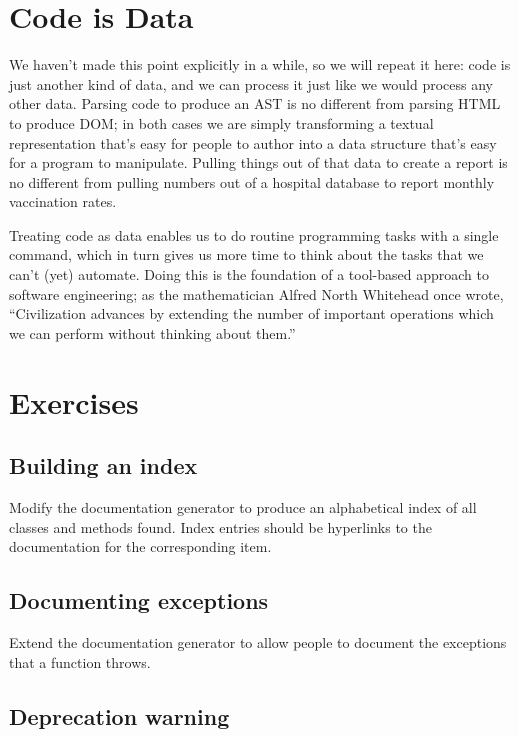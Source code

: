 \documentclass[krantzl]{krantz}
\begin{document}
\section{Code is Data}\label{doc-generator-note}


We haven’t made this point explicitly in a while,
so we will repeat it here:
code is just another kind of data,
and we can process it just like we would process any other data.
Parsing code to produce an AST is no different from parsing HTML to produce DOM;
in both cases we are simply transforming a textual representation that’s easy for people to author
into a data structure that’s easy for a program to manipulate.
Pulling things out of that data to create a report
is no different from pulling numbers out of a hospital database to report monthly vaccination rates.


Treating code as data enables us to do routine programming tasks with a single command,
which in turn gives us more time to think about the tasks that we can’t (yet) automate.
Doing this is the foundation of a tool-based approach to software engineering;
as the mathematician Alfred North Whitehead once wrote,
“Civilization advances by extending the number of important operations which we can perform without thinking about them.”

\section{Exercises}\label{doc-generator-exercises}

\subsection*{Building an index}


Modify the documentation generator to produce an alphabetical index of all classes and methods found.
Index entries should be hyperlinks to the documentation for the corresponding item.

\subsection*{Documenting exceptions}


Extend the documentation generator to allow people to document the exceptions that a function throws.

\subsection*{Deprecation warning}
\end{document}
